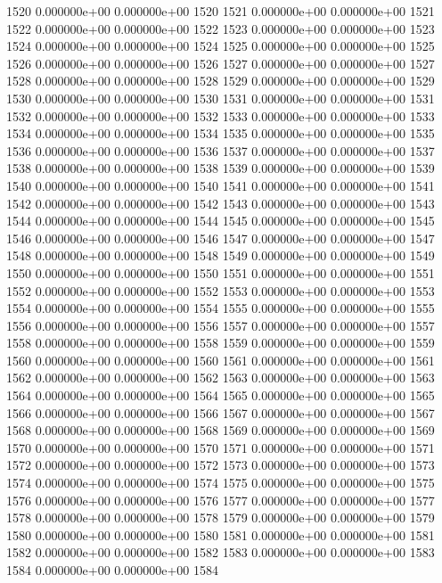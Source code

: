 \documentclass{article}
\begin{document}
\begin{Schunk}
\begin{Soutput}
1520   0.000000e+00   0.000000e+00 1520
1521   0.000000e+00   0.000000e+00 1521
1522   0.000000e+00   0.000000e+00 1522
1523   0.000000e+00   0.000000e+00 1523
1524   0.000000e+00   0.000000e+00 1524
1525   0.000000e+00   0.000000e+00 1525
1526   0.000000e+00   0.000000e+00 1526
1527   0.000000e+00   0.000000e+00 1527
1528   0.000000e+00   0.000000e+00 1528
1529   0.000000e+00   0.000000e+00 1529
1530   0.000000e+00   0.000000e+00 1530
1531   0.000000e+00   0.000000e+00 1531
1532   0.000000e+00   0.000000e+00 1532
1533   0.000000e+00   0.000000e+00 1533
1534   0.000000e+00   0.000000e+00 1534
1535   0.000000e+00   0.000000e+00 1535
1536   0.000000e+00   0.000000e+00 1536
1537   0.000000e+00   0.000000e+00 1537
1538   0.000000e+00   0.000000e+00 1538
1539   0.000000e+00   0.000000e+00 1539
1540   0.000000e+00   0.000000e+00 1540
1541   0.000000e+00   0.000000e+00 1541
1542   0.000000e+00   0.000000e+00 1542
1543   0.000000e+00   0.000000e+00 1543
1544   0.000000e+00   0.000000e+00 1544
1545   0.000000e+00   0.000000e+00 1545
1546   0.000000e+00   0.000000e+00 1546
1547   0.000000e+00   0.000000e+00 1547
1548   0.000000e+00   0.000000e+00 1548
1549   0.000000e+00   0.000000e+00 1549
1550   0.000000e+00   0.000000e+00 1550
1551   0.000000e+00   0.000000e+00 1551
1552   0.000000e+00   0.000000e+00 1552
1553   0.000000e+00   0.000000e+00 1553
1554   0.000000e+00   0.000000e+00 1554
1555   0.000000e+00   0.000000e+00 1555
1556   0.000000e+00   0.000000e+00 1556
1557   0.000000e+00   0.000000e+00 1557
1558   0.000000e+00   0.000000e+00 1558
1559   0.000000e+00   0.000000e+00 1559
1560   0.000000e+00   0.000000e+00 1560
1561   0.000000e+00   0.000000e+00 1561
1562   0.000000e+00   0.000000e+00 1562
1563   0.000000e+00   0.000000e+00 1563
1564   0.000000e+00   0.000000e+00 1564
1565   0.000000e+00   0.000000e+00 1565
1566   0.000000e+00   0.000000e+00 1566
1567   0.000000e+00   0.000000e+00 1567
1568   0.000000e+00   0.000000e+00 1568
1569   0.000000e+00   0.000000e+00 1569
1570   0.000000e+00   0.000000e+00 1570
1571   0.000000e+00   0.000000e+00 1571
1572   0.000000e+00   0.000000e+00 1572
1573   0.000000e+00   0.000000e+00 1573
1574   0.000000e+00   0.000000e+00 1574
1575   0.000000e+00   0.000000e+00 1575
1576   0.000000e+00   0.000000e+00 1576
1577   0.000000e+00   0.000000e+00 1577
1578   0.000000e+00   0.000000e+00 1578
1579   0.000000e+00   0.000000e+00 1579
1580   0.000000e+00   0.000000e+00 1580
1581   0.000000e+00   0.000000e+00 1581
1582   0.000000e+00   0.000000e+00 1582
1583   0.000000e+00   0.000000e+00 1583
1584   0.000000e+00   0.000000e+00 1584

\end{Soutput}
\end{Schunk}
\end{document}

